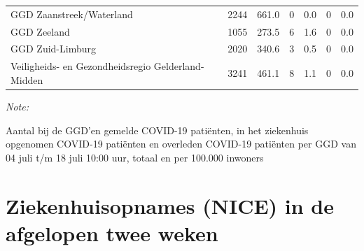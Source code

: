 \documentclass[
  english,
  man,floatsintext]{apa6}
\begin{document}
\begin{table}
\begin{threeparttable}
\begin{tabular}{lrrrrrr}
GGD Zaanstreek/Waterland & 2244 & 661.0 & 0 & 0.0 & 0 & 0.0\\
GGD Zeeland & 1055 & 273.5 & 6 & 1.6 & 0 & 0.0\\
GGD Zuid-Limburg & 2020 & 340.6 & 3 & 0.5 & 0 & 0.0\\
Veiligheids- en Gezondheidsregio Gelderland-Midden & 3241 & 461.1 & 8 & 1.1 & 0 & 0.0\\
\bottomrule
\end{tabular}
\begin{tablenotes}
\item \textit{Note: } 
\item Aantal bij de GGD’en gemelde COVID-19 patiënten, in het ziekenhuis opgenomen COVID-19 patiënten en overleden COVID-19 patiënten per GGD van 04 juli t/m 18 juli 10:00 uur, totaal en per 100.000 inwoners
\end{tablenotes}
\end{threeparttable}
\endgroup{}
\end{table}

\newpage

\hypertarget{ziekenhuisopnames-nice-in-de-afgelopen-twee-weken}{%
\section{Ziekenhuisopnames (NICE) in de afgelopen twee weken}\label{ziekenhuisopnames-nice-in-de-afgelopen-twee-weken}}
\end{document}
